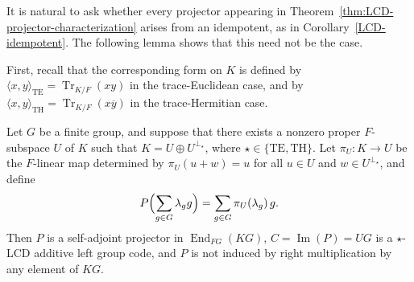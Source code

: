 \documentclass[11pt]{article}
\begin{document}
It is natural to ask whether every projector appearing in Theorem~\ref{thm:LCD-projector-characterization} arises from an idempotent, as in Corollary~\ref{LCD-idempotent}. The following lemma shows that this need not be the case.

First, recall that the corresponding form on $K$ is defined by
$
\langle x,y\rangle_{\mathrm{TE}}=\operatorname{Tr}_{K/F}(xy)
$
in the trace-Euclidean case, and by
$
\langle x,y\rangle_{\mathrm{TH}}=\operatorname{Tr}_{K/F}(x\overline{y})
$
in the trace-Hermitian case.



\begin{lemma}
Let $G$ be a finite group, and suppose that there exists a nonzero proper $F$-subspace $U$ of $K$ such that $K=U\oplus U^{\perp_\star}$, where $\star\in \{\mathrm{TE},\mathrm{TH}\}$. Let $\pi_U:K\longrightarrow U$ be the $F$-linear map determined by $\pi_U(u+w)=u$ for all $u\in U$ and $w\in U^{\perp_\star}$, and define
$$
P\Bigl(\sum_{g\in G}\lambda_g g\Bigr)=\sum_{g\in G}\pi_U(\lambda_g)\,g.
$$
Then $P$ is a self-adjoint projector in $\operatorname{End}_{FG}(KG)$, $C=\operatorname{Im}(P)=UG$ is a $\star$-LCD additive left group code, and $P$ is not induced by right multiplication by any element of $KG$.
\end{lemma}
\end{document}
